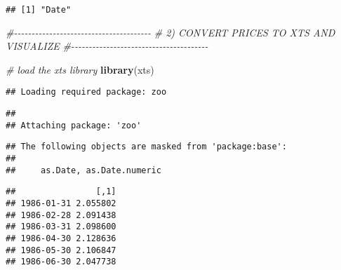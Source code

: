 \documentclass[
]{article}
\newenvironment{Shaded}{\begin{snugshade}}{\end{snugshade}}
\newcommand{\AttributeTok}[1]{\textcolor[rgb]{0.13,0.29,0.53}{#1}}
\newcommand{\CommentTok}[1]{\textcolor[rgb]{0.56,0.35,0.01}{\textit{#1}}}
\newcommand{\FunctionTok}[1]{\textcolor[rgb]{0.13,0.29,0.53}{\textbf{#1}}}
\newcommand{\NormalTok}[1]{#1}
\newcommand{\OtherTok}[1]{\textcolor[rgb]{0.56,0.35,0.01}{#1}}
\newcommand{\SpecialCharTok}[1]{\textcolor[rgb]{0.81,0.36,0.00}{\textbf{#1}}}
\begin{document}
\begin{Shaded}
\end{Shaded}

\begin{verbatim}
## [1] "Date"
\end{verbatim}

\begin{Shaded}
\begin{Highlighting}[]
\CommentTok{\#{-}{-}{-}{-}{-}{-}{-}{-}{-}{-}{-}{-}{-}{-}{-}{-}{-}{-}{-}{-}{-}{-}{-}{-}{-}{-}{-}{-}{-}{-}{-}{-}{-}{-}{-}{-}{-}{-}{-}}
\CommentTok{\# 2) CONVERT PRICES TO XTS AND VISUALIZE}
\CommentTok{\#{-}{-}{-}{-}{-}{-}{-}{-}{-}{-}{-}{-}{-}{-}{-}{-}{-}{-}{-}{-}{-}{-}{-}{-}{-}{-}{-}{-}{-}{-}{-}{-}{-}{-}{-}{-}{-}{-}{-}}

\CommentTok{\# load the xts library}
\FunctionTok{library}\NormalTok{(xts)}
\end{Highlighting}
\end{Shaded}

\begin{verbatim}
## Loading required package: zoo
\end{verbatim}

\begin{verbatim}
## 
## Attaching package: 'zoo'
\end{verbatim}

\begin{verbatim}
## The following objects are masked from 'package:base':
## 
##     as.Date, as.Date.numeric
\end{verbatim}

\begin{Shaded}
\end{Shaded}

\begin{verbatim}
##                [,1]
## 1986-01-31 2.055802
## 1986-02-28 2.091438
## 1986-03-31 2.098600
## 1986-04-30 2.128636
## 1986-05-30 2.106847
## 1986-06-30 2.047738
\end{verbatim}
\end{document}

